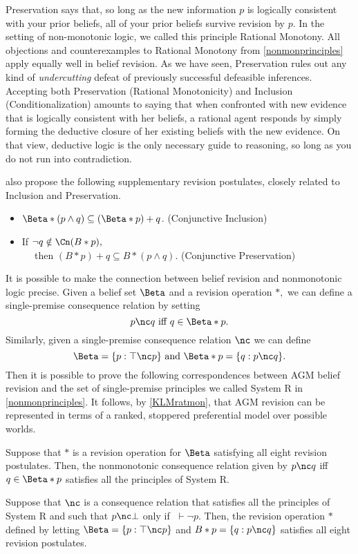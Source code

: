 Preservation says that, so long as the new information $p$ is logically
consistent with your prior beliefs, all of your prior beliefs survive revision
by $p$. In the setting of non-monotonic logic, we called this principle Rational
Monotony. All objections and counterexamples to Rational Monotony from
\autoref{nonmonprinciples} apply equally well in belief revision. As we have
seen, Preservation rules out any kind of {\em undercutting} defeat of previously
successful defeasible inferences. Accepting both Preservation (Rational
Monotonicity) and Inclusion (Conditionalization) amounts to saying that when
confronted with new evidence that is logically consistent with her beliefs, a
rational agent responds by simply forming the deductive closure of her existing
beliefs with the new evidence. On that view, deductive logic is the only
necessary guide to reasoning, so long as you do not run into contradiction.

\citet{alchourron1985logic} also propose the following supplementary revision
postulates, closely related to Inclusion and Preservation. 
\begin{itemize}
\item[] $\Beta*(p\wedge q) \subseteq (\Beta*p)+q$. \hfill(Conjunctive Inclusion)
\item[] If $\neg q \notin \Cn(B*p),$ \\ $\phantom{M}$\hspace{1.5em} then
$(B*p)+q \subseteq B*(p \wedge q)$. \hfill(Conjunctive Preservation)
\end{itemize}
It is possible to make the connection between belief revision and nonmonotonic
logic precise. Given a belief set $\Beta$ and a revision operation $*,$ we can
define a single-premise consequence relation by setting $$p\nc q \text{ iff } q
\in \Beta*p.$$ Similarly, given a single-premise consequence relation $\nc$ we
can define $$\Beta = \{ p : \top \nc p \} \text{ and } \Beta * p = \{ q : p\nc q
\}.$$ Then it is possible to prove the following correspondences between AGM
belief revision and the set of single-premise principles we called System R in
\autoref{nonmonprinciples}. It follows, by \autoref{KLMratmon}, that AGM
revision can be represented in terms of a ranked, stoppered preferential model
over possible worlds.
\begin{theorem}
Suppose that $*$ is a revision operation for $\Beta$ satisfying all eight
revision postulates. Then, the nonmonotonic consequence relation given by $p\nc
q$ iff $q\in \Beta * p$ satisfies all the principles of System R. 
\end{theorem}
\begin{theorem}
Suppose that $\nc$ is a consequence relation that satisfies all the principles
of System R and such that $p\nc \bot$ only if $\;\vdash \neg p$. Then, the
revision operation $*$ defined by letting $\Beta = \{ p : \top \nc p \}$ and
$B*p = \{ q : p\nc q \}$ satisfies all eight revision postulates.
\end{theorem}



